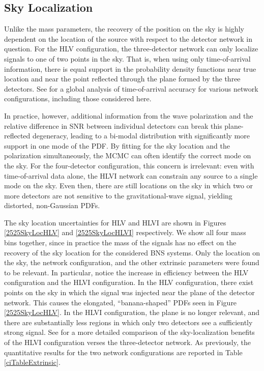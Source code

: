 \documentclass[11pt,a4paper]{emulateapj}
\begin{document}
\subsection{Sky Localization}
\label{skySection}
 
Unlike the mass parameters, the recovery of the position on the sky is highly dependent 
on the location of the source with respect to the detector network in question. 
For the HLV configuration, the three-detector network can only localize signals to one of
two points in the sky.  That is, when using only time-of-arrival information, there is 
equal support in the probability density functions near true location and near the 
point reflected through the plane formed by the three detectors.  See  \cite{Fairhurst2011} for
 a global analysis of time-of-arrival accuracy for various network configurations, including those considered
 here.  
  
  
  In practice, however, additional information from the wave polarization and the relative difference
  in SNR between individual detectors can break this plane-reflected degeneracy,
   leading to a bi-modal distribution with significantly more support in one mode of the PDF.
     By fitting for the sky location and the polarization simultaneously, the MCMC can often identify
   the correct mode on the sky.  For the four-detector configuration, this concern is irrelevant: even with time-of-arrival
   data alone, the HLVI network can constrain any source to a single mode on the sky.  Even then, there are still locations 
   on the sky in which two or more detectors are not sensitive to the gravitational-wave signal, yielding
    distorted, non-Gaussian PDFs.  

The sky location uncertainties for HLV and HLVI are shown in Figures \ref{2525SkyLocHLV}
 and \ref{2525SkyLocHLVI} respectively.  We show all four mass bins together, since in practice
  the mass of the signals has no effect on the recovery of the sky location for the considered BNS systems.
    Only the location on 
  the sky, the network configuration, and the other extrinsic parameters were found to be relevant.  
  In particular, notice the increase in efficiency between the HLV configuration and the HLVI 
  configuration.  In the HLV configuration, there exist points on the sky in which the signal was injected
  near the plane of the detector network.  This causes the elongated, ``banana-shaped'' PDFs seen in
  Figure \ref{2525SkyLocHLV}.  In the HLVI configuration, the plane is no longer relevant, and there are substantially
  less regions in which only two detectors see a sufficiently strong signal.  
  See \cite{Veitch2012} for a more detailed comparison of the sky-localization benefits of the HLVI 
  configuration verses the three-detector network.  As previously, the quantitative results for the two network configurations
  are reported in Table \ref{ciTableExtrinsic}.
\end{document}
